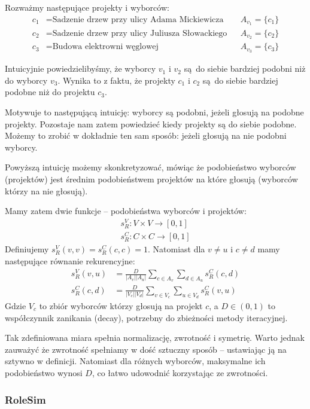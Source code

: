 \documentclass{article}
\begin{document}
Rozważmy następujące projekty i wyborców:
\begin{align*}
  c_1 &= \text{Sadzenie drzew przy ulicy Adama Mickiewicza} && A_{v_1} = \{c_1\} \\
  c_2 &= \text{Sadzenie drzew przy ulicy Juliusza Słowackiego} && A_{v_2} = \{c_2\} \\
  c_3 &= \text{Budowa elektrowni węglowej} && A_{v_3} = \{c_3\}
\end{align*}

Intuicyjnie powiedzielibyśmy, że wyborcy $v_1$ i $v_2$ są do siebie bardziej
podobni niż do wyborcy $v_3$. Wynika to z faktu, że projekty $c_1$ i $c_2$
są do siebie bardziej podobne niż do projektu $c_3$.

Motywuje to następującą intuicję: wyborcy są podobni, jeżeli głosują na podobne
projekty. Pozostaje nam zatem powiedzieć kiedy projekty są do siebie podobne.
Możemy to zrobić w dokładnie ten sam sposób: jeżeli głosują na nie podobni
wyborcy.

Powyższą intuicję możemy skonkretyzować, mówiąc że podobieństwo wyborców
(projektów) jest średnim podobieństwem projektów na które głosują (wyborców
którzy na nie głosują).

Mamy zatem dwie funkcje -- podobieństwa wyborców i projektów:
\begin{align*}
  s^V_R : V \times V \to [0, 1] \\
  s^C_R : C \times C \to [0, 1]
\end{align*}
Definiujemy $s^V_R(v,v)=s^C_R(c,c)=1$. Natomiast dla $v \neq u$ i $c \neq d$
mamy następujące równanie rekurencyjne:
\begin{align*}
  s^V_R(v, u) &= \frac{D}{|A_v| |A_u|} \sum_{c \in A_v} \sum_{d \in A_u} s^C_R(c, d) \\
  s^C_R(c, d) &= \frac{D}{|V_c| |V_d|} \sum_{v \in V_c} \sum_{u \in V_d} s^C_R(v, u)
\end{align*}
Gdzie $V_c$ to zbiór wyborców którzy głosują na projekt $c$, a $D \in (0, 1)$
to współczynnik zanikania (decay), potrzebny do zbieżności metody iteracyjnej.

Tak zdefiniowana miara spełnia normalizację, zwrotność i symetrię. Warto
jednak zauważyć że zwrotność spełniamy w dość sztuczny sposób -- ustawiając
ją na sztywno w definicji. Natomiast dla różnych wyborców, maksymalne ich
podobieństwo wynosi $D$, co łatwo udowodnić korzystając ze zwrotności.


\subsubsection{RoleSim}
\end{document}

